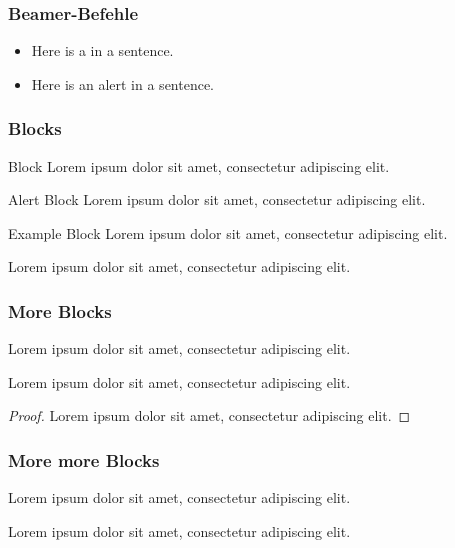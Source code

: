 \documentclass[aspectratio=169,t]{beamer}
\begin{document}
\begin{frame}
  \frametitle{Beamer-Befehle}

  \begin{itemize}
    \item Here is a  in a sentence.
    \item Here is an \alert{alert} in a sentence.
  \end{itemize}
\end{frame}

\begin{frame}
  \frametitle{Blocks}

  \begin{block}{Block}
    Lorem ipsum dolor sit amet, consectetur adipiscing elit.
  \end{block}

  \begin{alertblock}{Alert Block}
    Lorem ipsum dolor sit amet, consectetur adipiscing elit.
  \end{alertblock}

  \begin{exampleblock}{Example Block}
    Lorem ipsum dolor sit amet, consectetur adipiscing elit.
  \end{exampleblock}

  \begin{example}
    Lorem ipsum dolor sit amet, consectetur adipiscing elit.
  \end{example}

\end{frame}

\begin{frame}
  \frametitle{More Blocks}

  \begin{definition}
    Lorem ipsum dolor sit amet, consectetur adipiscing elit.
  \end{definition}

  \begin{theorem}
    Lorem ipsum dolor sit amet, consectetur adipiscing elit.
  \end{theorem}

  \begin{proof}
    Lorem ipsum dolor sit amet, consectetur adipiscing elit.
  \end{proof}

\end{frame}

\begin{frame}
  \frametitle{More more Blocks}

  \begin{lemma}
    Lorem ipsum dolor sit amet, consectetur adipiscing elit.
  \end{lemma}

  \begin{corollary}
    Lorem ipsum dolor sit amet, consectetur adipiscing elit.
  \end{corollary}

\end{frame}
\end{document}
